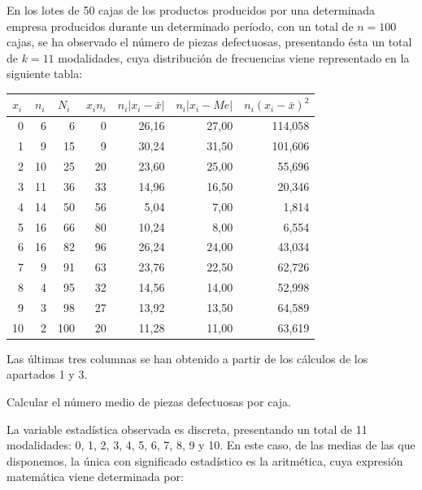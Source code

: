 En los lotes de 50 cajas de los productos producidos por una determinada empresa producidos durante un determinado período, con un total de $n = 100$ cajas, se ha observado el número de piezas defectuosas, presentando ésta un total de $k = 11$ modalidades, cuya distribución de frecuencias viene representado en la siguiente tabla:
\begin{center}
	\begin{table}[htbp]
		\begin{center}
			\begin{tabular}{|r|r|r|r|r|r|r|}
				\hline
				\multicolumn{1}{|l|}{$x_{i}$} & \multicolumn{1}{l|}{$n_{i}$} & \multicolumn{1}{l|}{$N_{i}$} &
				\multicolumn{1}{l|}{$x_{i}n_{i}$} & \multicolumn{1}{l|}{$n_{i}|x_{i} - \bar x|$} & \multicolumn{1}{l|}{$n_{i}|x_{i} - Me|$} & \multicolumn{1}{l|}{$n_{i}(x_{i} - \bar x)^2$} \\ \hline
				0 & 6 & 6 & 0 & 26,16 & 27,00 & 114,058 \\ \hline
				1 & 9 & 15 & 9 & 30,24 & 31,50 & 101,606 \\ \hline
				2 & 10 & 25 & 20 & 23,60 & 25,00 & 55,696 \\ \hline
				3 & 11 & 36 & 33 & 14,96 & 16,50 & 20,346 \\ \hline
				4 & 14 & 50 & 56 & 5,04 & 7,00 & 1,814 \\ \hline
				5 & 16 & 66 & 80 & 10,24 & 8,00 & 6,554 \\ \hline
				6 & 16 & 82 & 96 & 26,24 & 24,00 & 43,034 \\ \hline
				7 & 9 & 91 & 63 & 23,76 & 22,50 & 62,726 \\ \hline
				8 & 4 & 95 & 32 & 14,56 & 14,00 & 52,998 \\ \hline
				9 & 3 & 98 & 27 & 13,92 & 13,50 & 64,589 \\ \hline
				10 & 2 & 100 & 20 & 11,28 & 11,00 & 63,619 \\ \hline
			\end{tabular}
		\end{center}
	\end{table}	
	
\end{center}

Las últimas tres columnas se han obtenido a partir de los cálculos de los apartados 1 y 3. 

\subproblem
Calcular el n{\'u}mero medio de piezas defectuosas por caja.

La variable estadística observada es discreta, presentando un total de 11 modalidades: 0, 1, 2, 3, 4, 5, 6, 7, 8, 9 y 10. En este caso, de las medias de las que disponemos, la única con significado estadístico es la aritmética, cuya expresión matemática viene determinada por:

